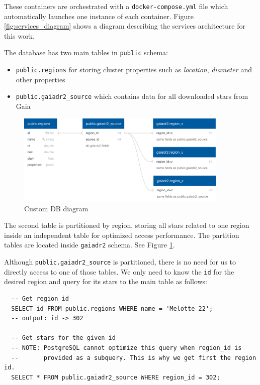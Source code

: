 \documentclass[11pt, a4paper, english]{book}
\begin{document}
These containers are orchestrated with a \verb|docker-compose.yml| file which automatically launches one instance of each container.
Figure \ref{fig:services_diagram} shows a diagram describing the services architecture for this work.

The database has two main tables in \verb|public| schema:

\begin{itemize}
  \item \verb|public.regions| for storing cluster properties such as \emph{location}, \emph{diameter} and other properties
  \item \verb|public.gaiadr2_source| which contains data for all downloaded stars from Gaia
\end{itemize}

\begin{figure}[htbp]
  \centering
  \includegraphics[width=0.9\textwidth]{../figures/customdb_diagram.pdf}
  \caption{Custom DB diagram}
  \label{fig:customdb_diagram}
\end{figure}

The second table is partitioned by region, storing all stars related to one region inside an independent table for optimized access performance.
The partition tables are located inside \verb|gaiadr2| schema. See Figure \ref{fig:customdb_diagram}.

Although \verb|public.gaiadr2_source| is partitioned, there is no need for us to directly access to one of those tables.
We only need to know the \verb|id| for the desired region and query for its stars to the main table as follows:

\begin{verbatim}
  -- Get region id
  SELECT id FROM public.regions WHERE name = 'Melotte 22';
  -- output: id -> 302

  -- Get stars for the given id
  -- NOTE: PostgreSQL cannot optimize this query when region_id is
  --       provided as a subquery. This is why we get first the region id.
  SELECT * FROM public.gaiadr2_source WHERE region_id = 302;
\end{verbatim}
\end{document}
